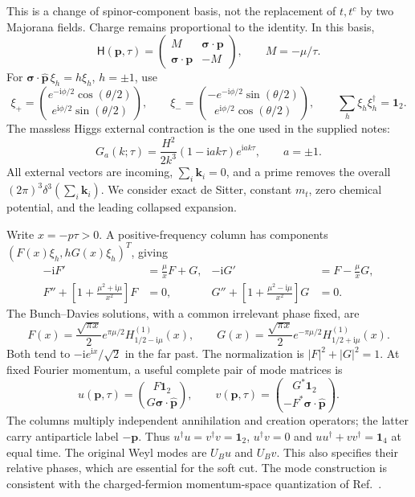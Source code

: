 \documentclass[a4paper,12pt]{article}
\newcommand{\ii}{\mathrm i}
\newcommand{\bk}{\bm k}
\newcommand{\bs}{\bm\sigma}
\newcommand{\one}{\mathbf1_2}
\begin{document}
This is a change of spinor-component basis, not the replacement of $t,t^c$ by two
Majorana fields. Charge remains proportional to the identity. In this basis,
\begin{equation}
 \mathsf H(\bm p,\tau)=\begin{pmatrix}M&\bs\cdot\bm p\\\bs\cdot\bm p&-M\end{pmatrix},
 \qquad M=-\mu/\tau.
\end{equation}
For $\bs\cdot\hat{\bm p}\,\xi_h=h\xi_h$, $h=\pm1$, use
\begin{equation}
 \xi_+=\binom{e^{-\ii\phi/2}\cos(\theta/2)}{e^{\ii\phi/2}\sin(\theta/2)},\qquad
 \xi_-=\binom{-e^{-\ii\phi/2}\sin(\theta/2)}{e^{\ii\phi/2}\cos(\theta/2)},\qquad
 \sum_h\xi_h\xi_h^\dagger=\one.
\end{equation}
The massless Higgs external contraction is the one used in the supplied notes:
\begin{equation}
 G_a(k;\tau)=\frac{H^2}{2k^3}(1-\ii a k\tau)e^{\ii a k\tau},\qquad a=\pm1.
 \label{eq:higgs}
\end{equation}
All external vectors are incoming, $\sum_i\bk_i=0$, and a prime removes the overall
$(2\pi)^3\delta^3(\sum_i\bk_i)$. We consider exact de Sitter, constant $m_t$, zero
chemical potential, and the leading collapsed expansion.

Write $x=-p\tau>0$. A positive-frequency column has components
$(F(x)\xi_h,hG(x)\xi_h)^T$, giving
\begin{align}
 -\ii F'&=\frac\mu x F+G,& -\ii G'&=F-\frac\mu xG,\\
 F''+\left[1+\frac{\mu^2+\ii\mu}{x^2}\right]F&=0,&
 G''+\left[1+\frac{\mu^2-\ii\mu}{x^2}\right]G&=0.
\end{align}
The Bunch--Davies solutions, with a common irrelevant phase fixed, are
\begin{equation}
 \boxed{F(x)=\frac{\sqrt{\pi x}}2 e^{\pi\mu/2}H^{(1)}_{1/2-\ii\mu}(x),\qquad
 G(x)=\frac{\sqrt{\pi x}}2 e^{-\pi\mu/2}H^{(1)}_{1/2+\ii\mu}(x).}
 \label{eq:modes}
\end{equation}
Both tend to $-\ii e^{\ii x}/\sqrt2$ in the far past. The normalization is
$|F|^2+|G|^2=1$. At fixed Fourier momentum, a useful complete pair of mode matrices is
\begin{equation}
 u(\bm p,\tau)=\binom{F\one}{G\bs\cdot\hat{\bm p}},\qquad
 v(\bm p,\tau)=\binom{G^*\one}{-F^*\bs\cdot\hat{\bm p}}.
 \label{eq:uv}
\end{equation}
The columns multiply independent annihilation and creation operators; the latter
carry antiparticle label $-\bm p$. Thus $u^\dagger u=v^\dagger v=\one$,
$u^\dagger v=0$ and $uu^\dagger+vv^\dagger=\mathbf1_4$ at equal time.
The original Weyl modes are $U_Bu$ and $U_Bv$. This also specifies their relative
phases, which are essential for the soft cut. The mode construction is consistent
with the charged-fermion momentum-space quantization of Ref.~\cite{cota}.
\end{document}
